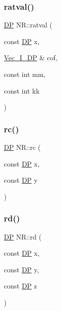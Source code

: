 \subsubsection{\texorpdfstring{ratval()}{ratval()}}
{\footnotesize\ttfamily \mbox{\hyperlink{namespaceNR_af6ff762dd605ff477b8e52387253a02a}{DP}} N\+R\+::ratval (\begin{DoxyParamCaption}\item[{const \mbox{\hyperlink{namespaceNR_af6ff762dd605ff477b8e52387253a02a}{DP}}}]{x,  }\item[{\mbox{\hyperlink{namespaceNR_a9f943da53862537c552e2a770cb170ae}{Vec\+\_\+\+I\+\_\+\+DP}} \&}]{cof,  }\item[{const int}]{mm,  }\item[{const int}]{kk }\end{DoxyParamCaption})}

\mbox{\label{namespaceNR_a7d42c86df6be02b1e38a5bf9a51884d8}} 
\subsubsection{\texorpdfstring{rc()}{rc()}}
{\footnotesize\ttfamily \mbox{\hyperlink{namespaceNR_af6ff762dd605ff477b8e52387253a02a}{DP}} N\+R\+::rc (\begin{DoxyParamCaption}\item[{const \mbox{\hyperlink{namespaceNR_af6ff762dd605ff477b8e52387253a02a}{DP}}}]{x,  }\item[{const \mbox{\hyperlink{namespaceNR_af6ff762dd605ff477b8e52387253a02a}{DP}}}]{y }\end{DoxyParamCaption})}

\mbox{\label{namespaceNR_a06e58a52a06276e59cdd77e651547f2c}} 
\subsubsection{\texorpdfstring{rd()}{rd()}}
{\footnotesize\ttfamily \mbox{\hyperlink{namespaceNR_af6ff762dd605ff477b8e52387253a02a}{DP}} N\+R\+::rd (\begin{DoxyParamCaption}\item[{const \mbox{\hyperlink{namespaceNR_af6ff762dd605ff477b8e52387253a02a}{DP}}}]{x,  }\item[{const \mbox{\hyperlink{namespaceNR_af6ff762dd605ff477b8e52387253a02a}{DP}}}]{y,  }\item[{const \mbox{\hyperlink{namespaceNR_af6ff762dd605ff477b8e52387253a02a}{DP}}}]{z }\end{DoxyParamCaption})}

